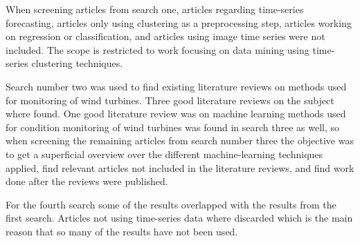 When screening articles from search one, articles regarding time-series forecasting, articles only using clustering as a preprocessing step, articles working on regression or classification, and articles using image time series were not included. The scope is restricted to work focusing on data mining using time-series clustering techniques. \bigskip

Search number two was used to find existing literature reviews on methods used for monitoring of wind turbines. Three good literature reviews on the subject where found. One good literature review was on machine learning methods used for condition monitoring of wind turbines was found in search three as well, so when screening the remaining articles from search number three the objective was to get a superficial overview over the different machine-learning techniques applied, find relevant articles not included in the literature reviews, and find work done after the reviews were published. \bigskip

For the fourth search some of the results overlapped with the results from the first search. Articles not using time-series data where discarded which is the main reason that so many of the results have not been used.